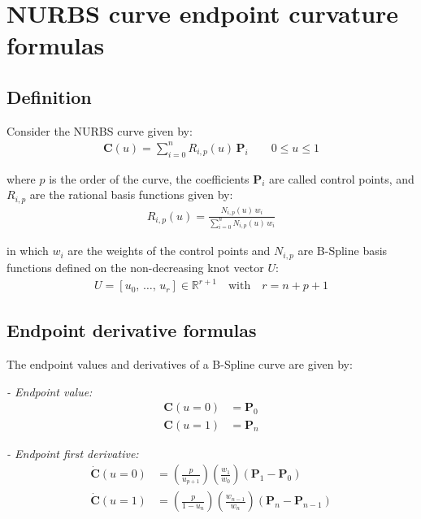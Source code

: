 \section{NURBS curve endpoint curvature formulas}
\label{sec:bspline}

\subsection{Definition}
Consider the NURBS curve given by:
\begin{align}
    \label{eq:def_nurbs_curve}
    \mathbf{C}(u)=\sum_{i=0}^{n} R_{i,p}(u) \, \mathbf{P}_{i} \quad \quad 0 \leq u \leq 1
\end{align}

where $p$ is the order of the curve, the coefficients $\mathbf{P}_{i}$ are called control points, and $R_{i,p}$ are the rational basis functions given by:
\begin{align}
    R_{i,p}(u) = \frac{N_{i,p}(u) \, w_{i}}{\sum\limits_{i=0}^{n} N_{i,p}(u) \, w_{i}}
\end{align}

in which $w_{i}$ are the weights of the control points and $N_{i,p}$ are B-Spline basis functions defined on the non-decreasing knot vector $U$:
\begin{align}
    U = [u_0,\, \dots,\, u_{r}] \in \mathds{R}^{r+1} \quad \text{with} \quad r = n + p + 1
\end{align}


\subsection{Endpoint derivative formulas}

The endpoint values and derivatives of a B-Spline curve are given by:

\textit{- Endpoint value:}
    \begin{align*}
        \mathbf{C}(u=0) &= \mathbf{P}_{0} \\
        \mathbf{C}(u=1) &= \mathbf{P}_{n}
    \end{align*}
    
\textit{- Endpoint first derivative:}
    \begin{align*}
        \mathbf{\dot{C}}(u=0) &= \left(\frac{p}{u_{p+1}}\right) \left(\frac{w_{1}}{w_{0}}\right) (\mathbf{P}_{1} - \mathbf{P}_{0}) \\
        \mathbf{\dot{C}}(u=1) &= \left(\frac{p}{1-u_{n}}\right) \left(\frac{w_{n-1}}{w_{n}}\right) (\mathbf{P}_{n} - \mathbf{P}_{n-1})
    \end{align*}

